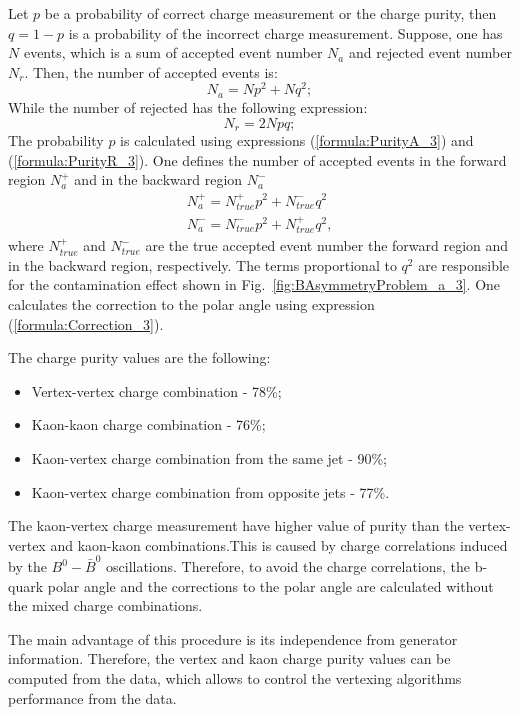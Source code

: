 Let $p$ be a probability of correct charge measurement or the charge purity, then $q = 1-p$ is a probability of the incorrect charge measurement. 
Suppose, one has $N$ events, which is a sum of accepted event number $N_a$ and rejected event number $N_r$. 
Then, the number of accepted events is:
\begin{equation}
	N_a = N p^2 + N q^2;
	\label{formula:PurityA_3}
\end{equation}
While the number of rejected has the following expression:
\begin{equation}
	N_r = 2N pq;
	\label{formula:PurityR_3}
\end{equation}
The probability $p$ is calculated using expressions (\ref{formula:PurityA_3}) and (\ref{formula:PurityR_3}).
One defines the number of accepted events in the forward region $N_a^+$ and in the backward region $N_a^-$ 
\begin{equation}
	\begin{array}{l}
	N_a^+ =  N^+_{true}p^2 + N^-_{true}q^2\\
	N_a^- =  N^-_{true}p^2 + N^+_{true}q^2,
	\end{array}
	\label{formula:Correction_3}
\end{equation}
where $N_{true}^+$ and  $N_{true}^-$ are the true accepted event number the forward region and in the backward region, respectively.
The terms proportional to $q^2$ are responsible for the contamination effect shown in Fig.~\ref{fig:BAsymmetryProblem_a_3}. 
One calculates the correction to the polar angle using expression (\ref{formula:Correction_3}).

The charge purity values are the following:
\begin{itemize}
	\item Vertex-vertex charge combination - 78\%;
	\item Kaon-kaon charge combination  - 76\%;
	\item Kaon-vertex charge combination from the same jet - 90\%;
	\item Kaon-vertex charge combination from opposite jets - 77\%.
\end{itemize}
The kaon-vertex  charge measurement have higher value of purity than the vertex-vertex and kaon-kaon combinations.This is caused by charge correlations induced by the $B^0-\bar{B}^0$ oscillations. 
Therefore, to avoid the charge correlations, the b-quark polar  angle and the corrections to the polar angle are calculated without the mixed charge combinations.

The main advantage of this procedure is its independence from generator information. 
Therefore, the vertex and kaon charge purity values can be computed from the data, which allows to control the vertexing algorithms performance from the data. 
